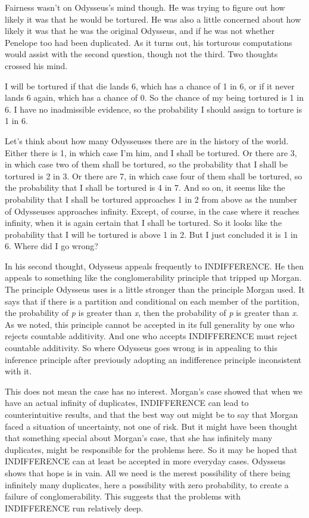 Fairness wasn't on Odysseus's mind though. He was trying to figure out how likely it was that he would be tortured. He was also a little concerned about how likely it was that he was the original Odysseus, and if he was not whether Penelope too had been duplicated. As it turns out, his torturous computations would assist with the second question, though not the third. Two thoughts crossed his mind.

I will be tortured if that die lands 6, which has a chance of 1 in 6, or if it never lands 6 again, which has a chance of 0. So the chance of my being tortured is 1 in 6. I have no inadmissible evidence, so the probability I should assign to torture is 1 in 6.

Let's think about how many Odysseuses there are in the history of the world. Either there is 1, in which case I'm him, and I shall be tortured. Or there are 3, in which case two of them shall be tortured, so the probability that I shall be tortured is 2 in 3. Or there are 7, in which case four of them shall be tortured, so the probability that I shall be tortured is 4 in 7. And so on, it seems like the probability that I shall be tortured approaches 1 in 2 from above as the number of Odysseuses approaches infinity. Except, of course, in the case where it reaches infinity, when it is again certain that I shall be tortured. So it looks like the probability that I will be tortured is above 1 in 2. But I just concluded it is 1 in 6. Where did I go wrong?

In his second thought, Odysseus appeals frequently to INDIFFERENCE. He then appeals to something like the conglomerability principle that tripped up Morgan. The principle Odysseus uses is a little stronger than the principle Morgan used. It says that if there is a partition and conditional on each member of the partition, the probability of \textit{p} is greater than \textit{x}, then the probability of \textit{p} is greater than \textit{x}. As we noted, this principle cannot be accepted in its full generality by one who rejects countable additivity. And one who accepts INDIFFERENCE must reject countable additivity. So where Odysseus goes wrong is in appealing to this inference principle after previously adopting an indifference principle inconsistent with it.

This does not mean the case has no interest. Morgan's case showed that when we have an actual infinity of duplicates, INDIFFERENCE can lead to counterintuitive results, and that the best way out might be to say that Morgan faced a situation of uncertainty, not one of risk. But it might have been thought that something special about Morgan's case, that she has infinitely many duplicates, might be responsible for the problems here. So it may be hoped that INDIFFERENCE can at least be accepted in more everyday cases. Odysseus shows that hope is in vain. All we need is the merest possibility of there being infinitely many duplicates, here a possibility with zero probability, to create a failure of conglomerability. This suggests that the problems with INDIFFERENCE run relatively deep.

